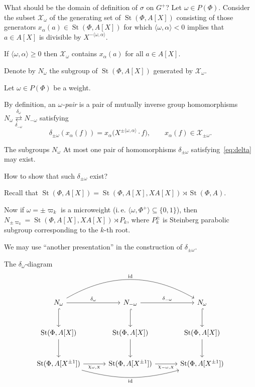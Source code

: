 \documentclass{beamer} %
\DeclareMathOperator{\St}{St}
\theoremstyle{definition}
\begin{document}
\begin{frame}{What should be the domain of definition of $\sigma$ on $G^+$? }
Let $\omega \in P(\Phi)$. Consider the subset $\mathcal{X}_\omega$ of the generating set of $\St(\Phi, A[X])$ consisting of those generators $x_{\alpha}(a) \in \St(\Phi, A[X])$ for which
$\langle \omega, \alpha\rangle < 0$ implies that $a \in A[X]$ is divisible by $X^{-\langle \omega, \alpha\rangle}$.
\pause

If $\langle \omega, \alpha\rangle \geq 0$ then $\mathcal{X}_\omega$ contains $x_\alpha(a)$ for all $a \in A[X]$.
\pause

Denote by $N_{\omega}$ the subgroup of $\St(\Phi, A[X])$ generated by $\mathcal{X}_\omega$.
\pause

Let $\omega \in P(\Phi)$ be a weight.

By definition, an \textit{$\omega$-pair} is a pair of mutually inverse group homomorphisms
\( N_\omega \overset{\delta_\omega}{\underset{\delta_{-\omega}}{\rightleftarrows}} N_{-\omega} \) satisfying
\begin{equation} \label{eq:delta} \delta_{\pm\omega}(x_\alpha(f)) = x_\alpha\!\bigl(X^{\pm\langle\omega,\alpha\rangle}\cdot f\bigr), \qquad x_\alpha(f)\in \mathcal{X}_{\pm\omega}. \end{equation}
\end{frame}

\begin{frame}{The subgroups $N_\omega$}
 At most one pair of homomorphisms $\delta_{\pm \omega}$ satisfying~\eqref{eq:delta} may exist.

 How to show that such $\delta_{\pm \omega}$ exist?

 \pause Recall that $\St(\Phi, A[X]) = \St(\Phi, A[X], XA[X]) \rtimes \St(\Phi, A)$.

 \pause Now if $\omega = \pm \varpi_k$ is a microweight (i.\,e. $\langle\omega, \Phi^+ \rangle \subseteq \{0, 1\}$), then
 $N_{\pm \varpi_k} = \St(\Phi, A[X], XA[X]) \rtimes P_k$, where $P_k^{\pm}$ is Steinberg parabolic subgroup corresponding to the $k$-th root.

 \pause We may use ``another presentation'' in the construction of $\delta_{\pm \omega}$.
\end{frame}


\begin{frame} [fragile]{The $\delta_{\omega}$-diagram}
\[
\begin{tikzcd}[ampersand replacement=\&, column sep=3.2em, row sep=2.6em]
N_\omega
  \arrow[r, "\delta_\omega"]
  \arrow[d, hook]
  \arrow[rr, bend left=30, "\mathrm{id}"]
\&
N_{-\omega}
  \arrow[r, "\delta_{-\omega}"]
  \arrow[d, hook]
\&
N_\omega
  \arrow[d, hook]
\\
\St(\Phi,A[X])
  \arrow[d]
\&
\St(\Phi,A[X])
  \arrow[d]
\&
\St(\Phi,A[X])
  \arrow[d]
\\
\St(\Phi,A[X^{\pm1}])
  \arrow[r, "\chi_{\omega,X}"']
  \arrow[rr, bend right=15, "\mathrm{id}"']
\&
\St(\Phi,A[X^{\pm1}])
  \arrow[r, "\chi_{-\omega,X}"']
\&
\St(\Phi,A[X^{\pm1}])
\end{tikzcd}
\]
\end{frame}
\end{document}
